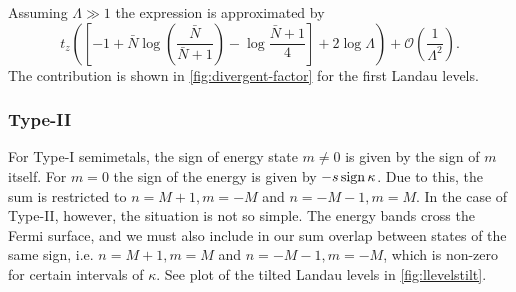 Assuming \( \Lambda \gg 1 \) the expression is approximated by
\begin{equation}
  \label{eq:126}
  t_z
  \left(
    \left[
  -1 + \bar{N} \log\left(\frac{\bar{N}}{\bar{N}+1}\right) - \log \frac{\bar{N}+1}{4}
  \right]
 + 2 \log\Lambda
\right) + \mathcal{O}\left(\frac{1}{\Lambda^2}\right).
\end{equation}
The contribution is shown in \cref{fig:divergent-factor} for the first Landau levels.



\subsubsection{Type-II}
For Type-I semimetals, the sign of energy state \( m \neq 0 \) is given by the sign of \( m \) itself.
For \( m = 0 \) the sign of the energy is given by \( -s \operatorname{sign}{\kappa } \).
Due to this, the sum is restricted to \( n=M+1, m=-M \) and \( n=-M-1, m=M \).
In the case of Type-II, however, the situation is not so simple.
The energy bands cross the Fermi surface, and we must also include in our sum overlap between states of the same sign, i.e. \( n=M+1, m=M \) and \( n=-M-1, m=-M \), which is non-zero for certain intervals of \( \kappa  \).
See plot of the tilted Landau levels in \cref{fig:llevelstilt}.


